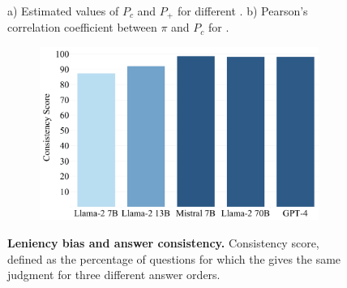 \begin{figure}[H]
\begin{subfigure}[t]{0.45\textwidth}
  \caption{}
  \label{fig:k-p-corr}
\end{subfigure}
\caption{a) Estimated values of $P_c$ and $P_+$ for different \judgemodels. b) Pearson's correlation coefficient between $\pi$ and $P_c$ for \judgemodels.}
\label{fig:leniency-bias-full}
\end{figure}

\begin{figure}[t]
    \centering
    \begin{subfigure}[b]{0.4\textwidth}
        \centering
        \includegraphics[width=\textwidth]{figures/Consistency.pdf}
        \label{fig:consistency}
    \end{subfigure}
    \caption{\textbf{Leniency bias and answer consistency.} Consistency score, defined as the percentage of questions for which the \judgemodel gives the same judgment for three different answer orders.}
\end{figure}


